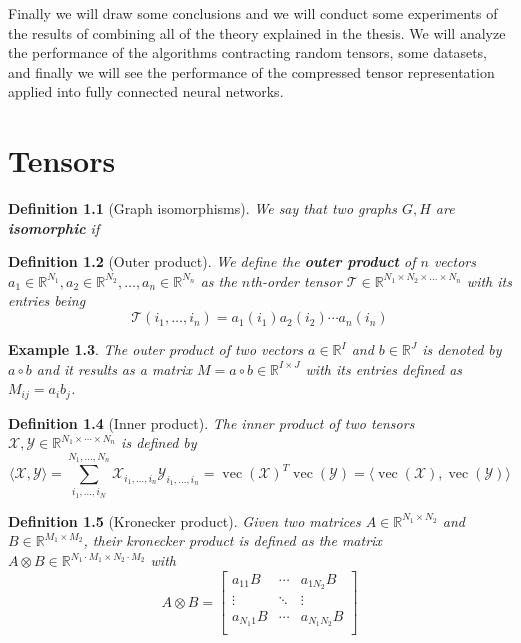 \documentclass[11pt,a4paper,openright,oneside]{book}
\numberwithin{equation}{section}
\newtheorem{defn0}{Definition}[chapter]
\newtheorem{example0}[defn0]{Example}
\newenvironment{definition}{ \begin{defn0}}{\end{defn0}}
\newenvironment{example}{ \begin{example0}\rm}{\end{example0}}
\DeclareMathOperator{\vectorize}{vec}
\begin{document}
Finally we will draw some conclusions and we will conduct some experiments of the results of combining all
of the theory explained in the thesis. We will analyze the performance of the algorithms contracting random tensors,
some datasets, and finally we will see the performance of the compressed tensor representation applied into fully connected
neural networks.

\chapter{Tensors}


\iffalse
\begin{definition}[Graph isomorphisms]
    We say that two graphs $G, H$ are \textbf{isomorphic} if 
\end{definition}


\begin{definition}[Outer product]
    We define the \textbf{outer product} of $n$ vectors 
    $a_1 \in \mathbb{R}^{N_1}, a_2 \in \mathbb{R}^{N_2}, \dots, a_n \in \mathbb{R}^{N_n}$
    as the $n$th-order tensor $\mathcal{T} \in \mathbb{R}^{N_1 \times N_2 \times \dots \times N_n}$ with its entries being
    $$\mathcal{T}(i_1, \dots, i_n) = a_1(i_1) a_2(i_2) \cdots a_n(i_n)$$
\end{definition}

\begin{example}
The outer product of two vectors $a \in \mathbb{R}^I$ and $b \in \mathbb{R}^J$ is denoted by $a \circ b$ and it results
as a matrix $M = a \circ b \in \mathbb{R}^{I \times J}$ with its entries defined as $M_{ij} = a_i b_j$.
\end{example}


\begin{definition}[Inner product]
The inner product of two tensors $\mathcal{X}, \mathcal{Y} \in \mathbb{R}^{N_1 \times \cdots \times N_n}$ is defined by
$$\langle \mathcal{X},\mathcal{Y} \rangle = \sum_{i_1, \dots, i_N}^{N_1, \dots, N_n} \mathcal{X}_{i_1, \dots, i_n} \mathcal{Y}_{i_1, \dots, i_n} = 
\vectorize(\mathcal{X})^T \vectorize(\mathcal{Y}) = \langle \vectorize(\mathcal{X}), \vectorize(\mathcal{Y}) \rangle$$
\end{definition}


\begin{definition}[Kronecker product]
     Given two matrices $A \in \mathbb{R}^{N_1 \times N_2}$ and $B \in \mathbb{R}^{M_1 \times M_2}$,
    their kronecker product is defined as the matrix $A \otimes B \in \mathbb{R}^{N_1 \cdot M_1 \times N_2 \cdot M_2}$ with
    $$A \otimes B = \begin{bmatrix}
        a_{11}B & \cdots & a_{1N_2}B \\ 
        \vdots & \ddots & \vdots \\
        a_{N_1 1}B & \cdots & a_{N_1 N_2}B \\
    \end{bmatrix}$$
\end{definition}
\end{document}
